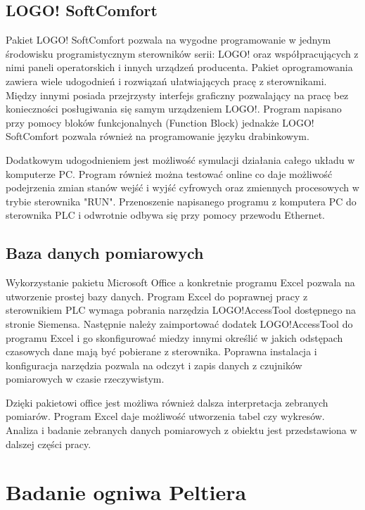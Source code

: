 \documentclass[oneside]{mgr}
\begin{document}
\section{LOGO! SoftComfort}
Pakiet LOGO! SoftComfort pozwala na wygodne programowanie w jednym środowisku programistycznym sterowników serii: LOGO! oraz współpracujących z nimi paneli operatorskich i innych urządzeń producenta. Pakiet oprogramowania zawiera wiele udogodnień i rozwiązań ułatwiających pracę z sterownikami. Między innymi posiada przejrzysty interfejs graficzny pozwalający na pracę bez konieczności posługiwania się samym urządzeniem LOGO!. Program napisano przy pomocy bloków funkcjonalnych (Function Block) jednakże LOGO! SoftComfort pozwala również na programowanie języku drabinkowym.

Dodatkowym udogodnieniem jest możliwość symulacji działania całego układu w komputerze PC. Program również można testować online co daje możliwość podejrzenia zmian stanów wejść i wyjść cyfrowych oraz zmiennych procesowych w trybie sterownika "RUN". Przenoszenie napisanego programu z komputera PC do sterownika PLC i odwrotnie odbywa się przy pomocy przewodu Ethernet.

\section{Baza danych pomiarowych}
Wykorzystanie pakietu Microsoft Office a konkretnie programu Excel pozwala na utworzenie prostej bazy danych. Program Excel do poprawnej pracy z sterownikiem PLC wymaga pobrania narzędzia LOGO!AccessTool dostępnego na stronie Siemensa. Następnie należy zaimportować dodatek LOGO!AccessTool do programu Excel i go skonfigurować miedzy innymi określić w jakich odstępach czasowych dane mają być pobierane z sterownika.  Poprawna instalacja i konfiguracja narzędzia pozwala na odczyt i zapis danych z czujników pomiarowych w czasie rzeczywistym. 

Dzięki pakietowi office jest możliwa również dalsza interpretacja zebranych pomiarów. Program Excel daje możliwość utworzenia tabel czy wykresów. Analiza i badanie zebranych danych pomiarowych z obiektu jest przedstawiona w dalszej części pracy.

\chapter{Badanie ogniwa Peltiera}
\end{document}
